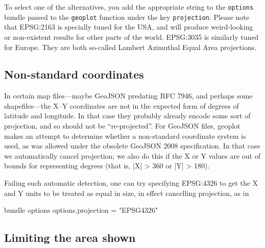 \documentclass{article}
\begin{document}
To select one of the alternatives, you add the appropriate string to
the \texttt{options} bundle passed to the \texttt{geoplot} function
under the key \texttt{projection}. Please note that \textsf{EPSG:2163}
is specially tuned for the USA, and will produce weird-looking or
non-existent results for other parts of the world. \textsf{EPSG:3035}
is similarly tuned for Europe. They are both so-called Lambert
Azimuthal Equal Area projections.

\subsection*{Non-standard coordinates}

In certain map files---maybe GeoJSON predating RFC 7946, and perhaps
some shapefiles---the X--Y coordinates are not in the expected form of
degrees of latitude and longitude. In that case they probably already
encode some sort of projection, and so should not be ``re-projected''.
For GeoJSON files, \textsf{geoplot} makes an attempt to determine
whether a non-standard coordinate system is used, as was allowed under
the obsolete GeoJSON 2008 specification. In that case we automatically
cancel projection; we also do this if the X or Y values are out of
bounds for representing degrees (that is, |X| > 360 or |Y| > 180).

Failing such automatic detection, one can try specifying
\textsf{EPSG:4326} to get the X and Y units to be treated as equal in
size, in effect cancelling projection, as in
\begin{code}
bundle options
options.projection = "EPSG4326"
\end{code}

\subsection*{Limiting the area shown}
\label{sec:xyranges}
\end{document}
